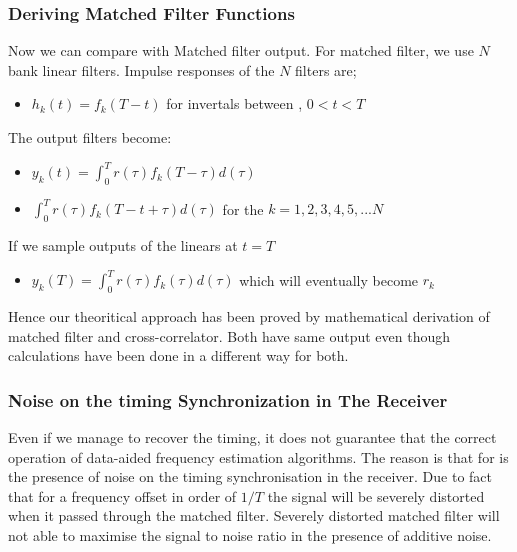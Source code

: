 \documentclass{beamer}
\begin{document}
\begin{frame}
	\frametitle{Deriving Matched Filter Functions}
Now we can compare with Matched filter output. For matched filter, we use $N$ bank linear filters. Impulse responses of the $N$ filters are;
\begin{itemize}
	\item $h_k(t)=f_k(T-t)$ for invertals between , $0<t<T$
\end{itemize}

The output filters become:
\begin{itemize}
	\item $y_k(t)=\int_{0}^{T} r(\tau) f_k(T-\tau)d(\tau)$
	\item $\int_{0}^{T} r(\tau) f_k(T-t+\tau)d(\tau)$ for the $k= 1,2,3,4,5,...N$
\end{itemize}
If we sample outputs of the linears at $t=T$
\begin{itemize}
\item $y_k(T)=\int_{0}^{T} r(\tau) f_k(\tau)d(\tau)$ which will eventually become $r_k$
\end{itemize}

Hence our theoritical approach has been proved by mathematical derivation of matched filter and cross-correlator. Both have same output even though calculations have been done in a different way for both.
\end{frame}

\begin{frame}
	\frametitle{Noise on the timing Synchronization in The Receiver}
Even if we manage to recover the timing, it does not guarantee that the correct operation of data-aided frequency estimation algorithms. The reason is that for is the presence of noise on the timing synchronisation in the receiver. Due to fact that for a frequency offset in order of $1/T$ the signal will be severely distorted when it passed through the matched filter. Severely distorted matched filter will not able to maximise the signal to noise ratio in the presence of additive noise.
\end{frame}
\end{document}

